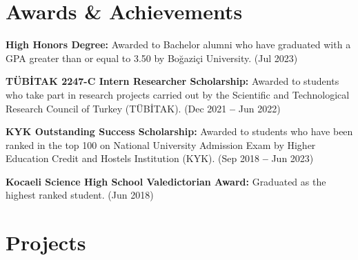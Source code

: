 \documentclass{resume}
\begin{document}
\section{Awards \& Achievements}
  \vspace{2pt}
  \resumeSubHeadingListStart
    \small{\item{
        \textbf{High Honors Degree:}{ Awarded to Bachelor alumni who have graduated with a GPA greater than or equal to 3.50 by Boğaziçi University. (Jul 2023)} \\ \vspace{3pt}

        \textbf{TÜBİTAK 2247-C Intern Researcher Scholarship:}{ Awarded to students who take part in research projects carried out by the Scientific and Technological Research Council of Turkey (TÜBİTAK). (Dec 2021 \textbf{--} Jun 2022)} \\ \vspace{3pt}
    
        
        \textbf{KYK Outstanding Success Scholarship:}{ Awarded to students who have been ranked in the top 100 on National University Admission Exam by Higher Education Credit and Hostels Institution (KYK). (Sep 2018 \textbf{--} Jun 2023)} \\ \vspace{3pt}
        
        
        \textbf{Kocaeli Science High School Valedictorian Award:}{ Graduated as the highest ranked student. (Jun 2018)}
    }}
  \resumeSubHeadingListEnd




\section{Projects}
    \vspace{3pt}
    \resumeSubHeadingListStart
      
\end{document}
